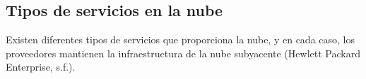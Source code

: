 \subsection{Tipos de servicios en la nube}
Existen diferentes tipos de servicios que proporciona la nube, y en cada caso, los proveedores mantienen la infraestructura de la nube subyacente (Hewlett Packard Enterprise, s.f.).
    
    
    